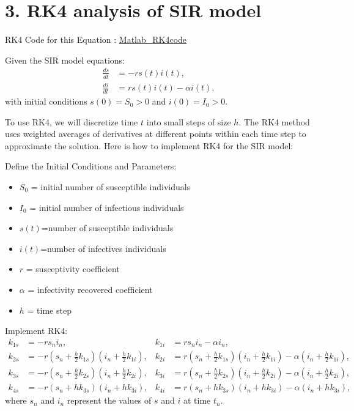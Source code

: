 \documentclass[10pt]{article}
\begin{document}
\section*{3. RK4 analysis of SIR model}
RK4 Code for this Equation : \href{https://github.com/RoshanRagnarok/Numerical_method-project.git}{Matlab\_RK4code}

\vspace{2\baselineskip}
Given the SIR model equations:
\begin{align*}
\frac{ds}{dt} &= -r s(t) i(t), \\
\frac{di}{dt} &= r s(t) i(t) - \alpha i(t),
\end{align*}
with initial conditions \(s(0) = S_0>0\) and \(i(0) = I_0>0\).

To use RK4, we will discretize time \(t\) into small steps of size \(h\). The RK4 method uses weighted averages of derivatives at different points within each time step to approximate the solution. Here is how to implement RK4 for the SIR model:

Define the Initial Conditions and Parameters:
\begin{itemize}
    \item \(S_0\) = initial number of susceptible individuals
    \item \(I_0\) = initial number of infectious individuals
    \item \(s(t)\)=number of susceptible individuals
    \item \(i(t)\)=number of infectives individuals
    \item \(r\) = susceptivity coefficient
    \item \(\alpha\) = infectivity recovered coefficient
    \item \(h\) = time step
    
\end{itemize}

Implement RK4:
\begin{align*}
k_{1s} &= -r s_n i_n, & k_{1i} &= r s_n i_n - \alpha i_n, \\
k_{2s} &= -r \left(s_n + \frac{h}{2} k_{1s}\right) \left(i_n + \frac{h}{2} k_{1i}\right), & k_{2i} &= r \left(s_n + \frac{h}{2} k_{1s}\right) \left(i_n + \frac{h}{2} k_{1i}\right) - \alpha \left(i_n + \frac{h}{2} k_{1i}\right), \\
k_{3s} &= -r \left(s_n + \frac{h}{2} k_{2s}\right) \left(i_n + \frac{h}{2} k_{2i}\right), & k_{3i} &= r \left(s_n + \frac{h}{2} k_{2s}\right) \left(i_n + \frac{h}{2} k_{2i}\right) - \alpha \left(i_n + \frac{h}{2} k_{2i}\right), \\
k_{4s} &= -r \left(s_n + h k_{3s}\right) \left(i_n + h k_{3i}\right), & k_{4i} &= r \left(s_n + h k_{3s}\right) \left(i_n + h k_{3i}\right) - \alpha \left(i_n + h k_{3i}\right),
\end{align*}
where \(s_n\) and \(i_n\) represent the values of \(s\) and \(i\) at time \(t_n\).
\end{document}
